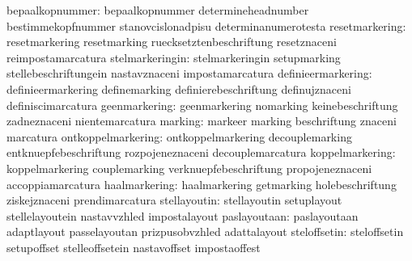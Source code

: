                  bepaalkopnummer: bepaalkopnummer                  determineheadnumber
                                  bestimmekopfnummer               stanovcislonadpisu
                                  determinanumerotesta
                  resetmarkering: resetmarkering                   resetmarking
                                  ruecksetztenbeschriftung         resetznaceni
                                  reimpostamarcatura
                 stelmarkeringin: stelmarkeringin                  setupmarking
                                  stellebeschriftungein            nastavznaceni
                                  impostamarcatura
              definieermarkering: definieermarkering               definemarking
                                  definierebeschriftung            definujznaceni
                                  definiscimarcatura
                   geenmarkering: geenmarkering                    nomarking
                                  keinebeschriftung                zadneznaceni
                                  nientemarcatura
                         marking: markeer                          marking
                                  beschriftung                     znaceni
                                  marcatura
              ontkoppelmarkering: ontkoppelmarkering               decouplemarking
                                  entknuepfebeschriftung           rozpojeneznaceni
                                  decouplemarcatura                %
                 koppelmarkering: koppelmarkering                  couplemarking
                                  verknuepfebeschriftung           propojeneznaceni
                                  accoppiamarcatura                %
                   haalmarkering: haalmarkering                    getmarking
                                  holebeschriftung                 ziskejznaceni
                                  prendimarcatura                  %
                    stellayoutin: stellayoutin                     setuplayout
                                  stellelayoutein                  nastavvzhled
                                  impostalayout
                    paslayoutaan: paslayoutaan                     adaptlayout
                                  passelayoutan                    prizpusobvzhled
                                  adattalayout
                    steloffsetin: steloffsetin                     setupoffset
                                  stelleoffsetein                  nastavoffset
                                  impostaoffest
